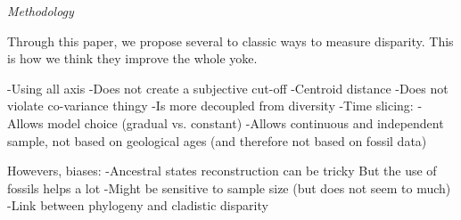 \documentclass[12pt,letterpaper]{article}
\renewcommand{\subsection}[1]{%
\bigskip
\begin{center}
\begin{large}
\normalfont\itshape #1
\end{large}
\end{center}}
\begin{document}


\subsection{Methodology}
Through this paper, we propose several to classic ways to measure disparity.
This is how we think they improve the whole yoke.

-Using all axis
    -Does not create a subjective cut-off
-Centroid distance
    -Does not violate co-variance thingy
    -Is more decoupled from diversity 
-Time slicing:
    -Allows model choice (gradual vs. constant)
    -Allows continuous and independent sample, not based on geological ages (and therefore not based on fossil data)

Howevers, biases:
    -Ancestral states reconstruction can be tricky
        But the use of fossils helps a lot \citep{Poly2001,Finarelli2006,Albert2009,Slater2012MEE}
    -Might be sensitive to sample size (but does not seem to much)
    -Link between phylogeny and cladistic disparity
\end{document}
